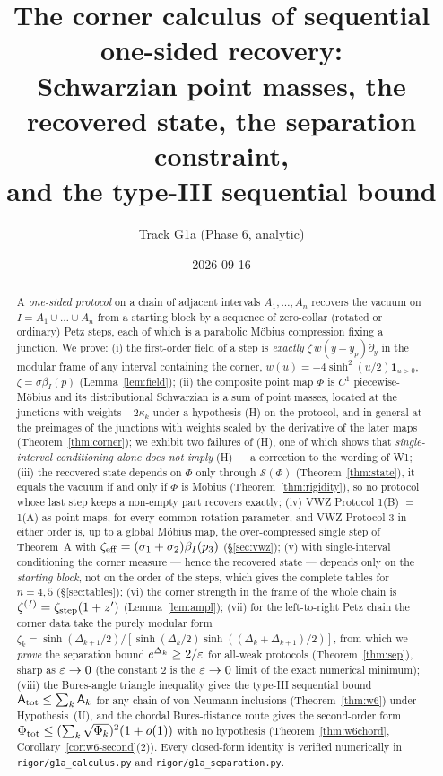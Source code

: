 \documentclass[11pt]{article}
\title{The corner calculus of sequential one-sided recovery:\\
Schwarzian point masses, the recovered state, the separation constraint,\\
and the type-III sequential bound}
\author{Track G1a (Phase 6, analytic)}
\date{2026-09-16}
\newcommand{\Sch}{\mathcal S}
\newcommand{\bI}{\beta_I}
\newcommand{\Bang}{\mathsf A}
\theoremstyle{definition}\newtheorem{example}[theorem]{Example}
\begin{document}
\maketitle

\begin{abstract}
A \emph{one-sided protocol} on a chain of adjacent intervals $A_1,\dots,A_n$ recovers the vacuum
on $I=A_1\cup\dots\cup A_n$ from a starting block by a sequence of zero-collar (rotated or
ordinary) Petz steps, each of which is a parabolic M\"obius compression fixing a junction.  We
prove: (i) the first-order field of a step is \emph{exactly} $\zeta\,w(y-y_p)\partial_y$ in the
modular frame of any interval containing the corner, $w(u)=-4\sinh^2(u/2)\mathbf 1_{u>0}$,
$\zeta=\sigma\bI(p)$ (Lemma~\ref{lem:field}); (ii) the composite point map $\Phi$ is $C^1$
piecewise-M\"obius and its distributional Schwarzian is a sum of point masses, located at the
junctions with weights $-2\kappa_k$ under a hypothesis (H) on the protocol, and in general at the
preimages of the junctions with weights scaled by the derivative of the later maps
(Theorem~\ref{thm:corner}); we exhibit two failures of (H), one of which shows that
\emph{single-interval conditioning alone does not imply} (H) --- a correction to the wording of
W1; (iii) the recovered state depends on $\Phi$ only through $\Sch(\Phi)$
(Theorem~\ref{thm:state}), it equals the vacuum if and only if $\Phi$ is M\"obius
(Theorem~\ref{thm:rigidity}), so no protocol whose last step keeps a non-empty part recovers
exactly; (iv) VWZ Protocol 1(B)
$=$ 1(A) as point maps, for every common rotation parameter, and VWZ Protocol 3 in either order
is, up to a global M\"obius map, the over-compressed single step of Theorem~A with
$\zeta_{\rm eff}=(\sigma_1+\sigma_2)\bI(p_3)$ (\S\ref{sec:vwz}); (v) with single-interval
conditioning the corner measure --- hence the recovered state --- depends only on the
\emph{starting block}, not on the order of the steps, which gives the complete tables for $n=4,5$
(\S\ref{sec:tables}); (vi) the corner strength in the frame of the whole chain is
$\zeta^{(I)}=\zeta_{\rm step}(1+z')$ (Lemma~\ref{lem:ampl}); (vii) for the left-to-right Petz
chain the corner data take the purely modular form
$\zeta_k=\sinh(\Delta_{k+1}/2)/[\sinh(\Delta_k/2)\sinh((\Delta_k+\Delta_{k+1})/2)]$, from which we
\emph{prove} the separation bound $e^{\Delta_k}\ge2/\varepsilon$ for all-weak protocols
(Theorem~\ref{thm:sep}), sharp as $\varepsilon\to0$ (the constant $2$ is the $\varepsilon\to0$ limit of the exact numerical minimum);
(viii) the Bures-angle triangle inequality gives the type-III sequential bound
$\Bang_{\rm tot}\le\sum_k\Bang_k$ for any chain of von Neumann inclusions
(Theorem~\ref{thm:w6}) under Hypothesis~(U), and the chordal Bures-distance route gives the
second-order form $\Phi_{\rm tot}\le(\sum_k\sqrt{\Phi_k})^2(1+o(1))$ with no hypothesis
(Theorem~\ref{thm:w6chord}, Corollary~\ref{cor:w6-second}(2)).  Every closed-form identity is verified numerically in
\texttt{rigor/g1a\_calculus.py} and \texttt{rigor/g1a\_separation.py}.
\end{abstract}
\end{document}
